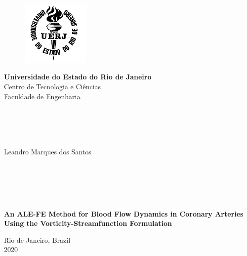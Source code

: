 \begin{titlepage}
\begin{center}

	\vspace{-0.5cm}

  \begin{figure}[hbt!]
		\begin{flushleft}
		   \includegraphics[width=3.44cm,height=3.17cm]{logos/logo_uerj_bw}
		\end{flushleft}
	\end{figure}
	\vspace{-4cm}

  \hspace{2cm}\Large{\textbf{Universidade do Estado do Rio de Janeiro}}\\
  \hspace{2cm}\Large{Centro de Tecnologia e Ciências}\\
  \hspace{2cm}\Large{Faculdade de Engenharia}\\

  \hspace{2cm}\large{}\\
  \hspace{2cm}\large{}\\
  \hspace{2cm}\large{}\\
  \hspace{2cm}\large{}\\

  \par
  \Large{Leandro Marques dos Santos}

  \hspace{2cm}\large{}\\
  \hspace{2cm}\large{}\\
  \hspace{2cm}\large{}\\
  \hspace{2cm}\large{}\\


  \par
  \textbf{\Large An ALE-FE Method for Blood Flow Dynamics in Coronary Arteries Using the Vorticity-Streamfunction Formulation}


  \par\vfill
  {\Large Rio de Janeiro, Brazil\\2020}

\end{center}
\end{titlepage}
